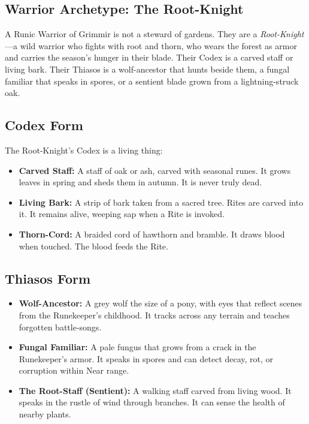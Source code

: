 \subsection{Warrior Archetype: The Root-Knight}

A Runic Warrior of Grimmir is not a steward of gardens. They are a \textit{Root-Knight}—a wild warrior who fights with root and thorn, who wears the forest as armor and carries the season's hunger in their blade. Their Codex is a carved staff or living bark. Their Thiasos is a wolf-ancestor that hunts beside them, a fungal familiar that speaks in spores, or a sentient blade grown from a lightning-struck oak.

\subsection{Codex Form}

The Root-Knight's Codex is a living thing:

\begin{itemize}
\item \textbf{Carved Staff:} A staff of oak or ash, carved with seasonal runes. It grows leaves in spring and sheds them in autumn. It is never truly dead.
\item \textbf{Living Bark:} A strip of bark taken from a sacred tree. Rites are carved into it. It remains alive, weeping sap when a Rite is invoked.
\item \textbf{Thorn-Cord:} A braided cord of hawthorn and bramble. It draws blood when touched. The blood feeds the Rite.
\end{itemize}

\subsection{Thiasos Form}

\begin{itemize}
\item \textbf{Wolf-Ancestor:} A grey wolf the size of a pony, with eyes that reflect scenes from the Runekeeper's childhood. It tracks across any terrain and teaches forgotten battle-songs.
\item \textbf{Fungal Familiar:} A pale fungus that grows from a crack in the Runekeeper's armor. It speaks in spores and can detect decay, rot, or corruption within Near range.
\item \textbf{The Root-Staff (Sentient):} A walking staff carved from living wood. It speaks in the rustle of wind through branches. It can sense the health of nearby plants.
\end{itemize}

